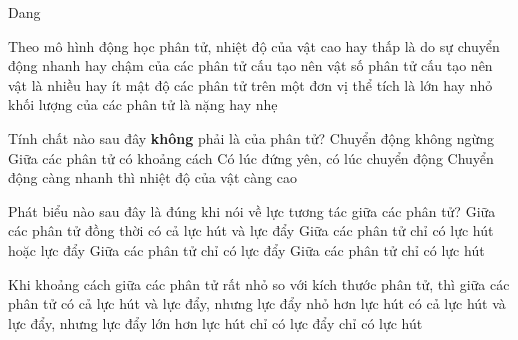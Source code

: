 \documentclass[
tuychon=HS1,
pagesize=BookA4,%
company=MAP, %
]{Class/MAPClass}
\renewcommand{\nguon}[1]{}
\renewcommand{\haidong}[1]{}
\begin{document}
\begin{cauhoiTN}{Dang}
\begin{ex}
{	}
	\haidong{2}\end{ex}
	\begin{ex}%
		Theo mô hình động học phân tử, nhiệt độ của vật cao hay thấp là do
		\choice
		{\True sự chuyển động nhanh hay chậm của các phân tử cấu tạo nên vật}
		{số phân tử cấu tạo nên vật là nhiều hay ít}
		{mật độ các phân tử trên một đơn vị thể tích là lớn hay nhỏ}
		{khối lượng của các phân tử là nặng hay nhẹ}
	\end{ex}
	\begin{ex}%
		Tính chất nào sau đây \textbf{không} phải là của phân tử?
		\choice
		{Chuyển động không ngừng}
		{Giữa các phân tử có khoảng cách}
		{\True Có lúc đứng yên, có lúc chuyển động}
		{Chuyển động càng nhanh thì nhiệt độ của vật càng cao}
		\haidong{2}\end{ex}
\begin{ex}%
	Phát biểu nào sau đây là đúng khi nói về lực tương tác giữa các phân tử?
	\choice
	{\True Giữa các phân tử đồng thời có cả lực hút và lực đẩy}
	{Giữa các phân tử chỉ có lực hút hoặc lực đẩy}
	{Giữa các phân tử chỉ có lực đẩy}
	{Giữa các phân tử chỉ có lực hút}
	\haidong{2}\end{ex}
	\begin{ex}%
		Khi khoảng cách giữa các phân tử rất nhỏ so với kích thước phân tử, thì giữa các phân tử
		\choice
		{có cả lực hút và lực đẩy, nhưng lực đẩy nhỏ hơn lực hút}
		{\True có cả lực hút và lực đẩy, nhưng lực đẩy lớn hơn lực hút}
		{chỉ có lực đẩy}
		{chỉ có lực hút}	
		\loigiai{
			\begin{itemize}

\end{itemize}}
\end{ex}
\end{cauhoiTN}
\end{document}
